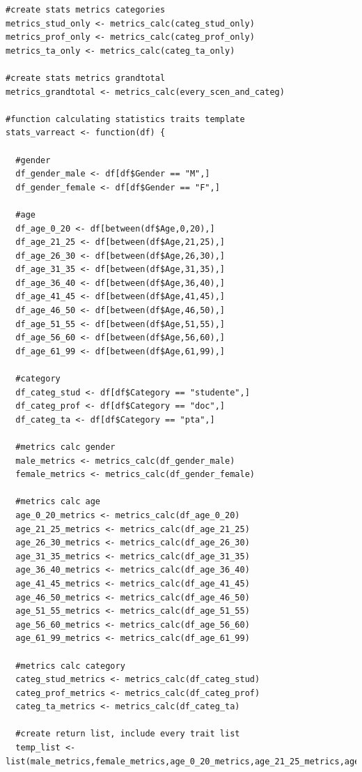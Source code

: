 \documentclass[a4paper]{article}
\begin{document}
\begin{lstlisting}
#create stats metrics categories
metrics_stud_only <- metrics_calc(categ_stud_only)
metrics_prof_only <- metrics_calc(categ_prof_only)
metrics_ta_only <- metrics_calc(categ_ta_only)

#create stats metrics grandtotal
metrics_grandtotal <- metrics_calc(every_scen_and_categ)

#function calculating statistics traits template
stats_varreact <- function(df) {
  
  #gender
  df_gender_male <- df[df$Gender == "M",]
  df_gender_female <- df[df$Gender == "F",]
  
  #age
  df_age_0_20 <- df[between(df$Age,0,20),]
  df_age_21_25 <- df[between(df$Age,21,25),]
  df_age_26_30 <- df[between(df$Age,26,30),]
  df_age_31_35 <- df[between(df$Age,31,35),]
  df_age_36_40 <- df[between(df$Age,36,40),]
  df_age_41_45 <- df[between(df$Age,41,45),]
  df_age_46_50 <- df[between(df$Age,46,50),]
  df_age_51_55 <- df[between(df$Age,51,55),]
  df_age_56_60 <- df[between(df$Age,56,60),]
  df_age_61_99 <- df[between(df$Age,61,99),]
  
  #category
  df_categ_stud <- df[df$Category == "studente",]
  df_categ_prof <- df[df$Category == "doc",]
  df_categ_ta <- df[df$Category == "pta",]
  
  #metrics calc gender
  male_metrics <- metrics_calc(df_gender_male)
  female_metrics <- metrics_calc(df_gender_female)
  
  #metrics calc age
  age_0_20_metrics <- metrics_calc(df_age_0_20)
  age_21_25_metrics <- metrics_calc(df_age_21_25)
  age_26_30_metrics <- metrics_calc(df_age_26_30)
  age_31_35_metrics <- metrics_calc(df_age_31_35)
  age_36_40_metrics <- metrics_calc(df_age_36_40)
  age_41_45_metrics <- metrics_calc(df_age_41_45)
  age_46_50_metrics <- metrics_calc(df_age_46_50)
  age_51_55_metrics <- metrics_calc(df_age_51_55)
  age_56_60_metrics <- metrics_calc(df_age_56_60)
  age_61_99_metrics <- metrics_calc(df_age_61_99)
  
  #metrics calc category
  categ_stud_metrics <- metrics_calc(df_categ_stud)
  categ_prof_metrics <- metrics_calc(df_categ_prof)
  categ_ta_metrics <- metrics_calc(df_categ_ta)
  
  #create return list, include every trait list
  temp_list <- list(male_metrics,female_metrics,age_0_20_metrics,age_21_25_metrics,age_26_30_metrics,age_31_35_metrics,age_36_40_metrics,age_41_45_metrics,age_46_50_metrics,age_51_55_metrics,age_56_60_metrics,age_61_99_metrics,categ_stud_metrics,categ_prof_metrics,categ_ta_metrics)
  

\end{lstlisting}
\end{document}
